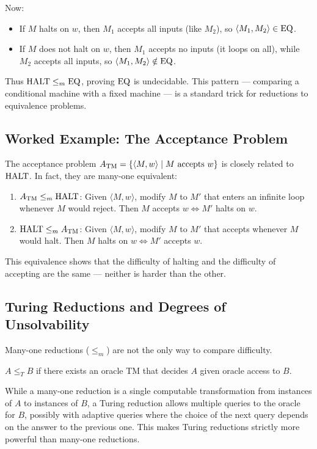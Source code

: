 Now:
\begin{itemize}
\item If $M$ halts on $w$, then $M_1$ accepts all inputs (like $M_2$), so $\langle M_1, M_2 \rangle \in \text{EQ}$.
\item If $M$ does not halt on $w$, then $M_1$ accepts no inputs (it loops on all), while $M_2$ accepts all inputs, so $\langle M_1, M_2 \rangle \notin \text{EQ}$.
\end{itemize}

Thus $\text{HALT} \le_m \text{EQ}$, proving $\text{EQ}$ is undecidable. This pattern — comparing a conditional machine with a fixed machine — is a standard trick for reductions to equivalence problems.

\subsection*{Worked Example: The Acceptance Problem}

The acceptance problem $A_{\text{TM}} = \{ \langle M, w \rangle \mid M \text{ accepts } w \}$ is closely related to $\text{HALT}$. In fact, they are many-one equivalent:

\begin{enumerate}
\item $A_{\text{TM}} \le_m \text{HALT}$: Given $\langle M, w \rangle$, modify $M$ to $M'$ that enters an infinite loop whenever $M$ would reject. Then $M$ accepts $w \iff M'$ halts on $w$.
\item $\text{HALT} \le_m A_{\text{TM}}$: Given $\langle M, w \rangle$, modify $M$ to $M'$ that accepts whenever $M$ would halt. Then $M$ halts on $w \iff M'$ accepts $w$.
\end{enumerate}

This equivalence shows that the difficulty of halting and the difficulty of accepting are the same — neither is harder than the other.

\subsection{Turing Reductions and Degrees of Unsolvability}
\label{sec:halting:turing}

Many-one reductions ($\le_m$) are not the only way to compare difficulty.

\begin{definition}
$A \le_T B$ if there exists an oracle TM that decides $A$ given oracle access to $B$.
\end{definition}

While a many-one reduction is a single computable transformation from instances of $A$ to instances of $B$, a Turing reduction allows multiple queries to the oracle for $B$, possibly with adaptive queries where the choice of the next query depends on the answer to the previous one. This makes Turing reductions strictly more powerful than many-one reductions.

